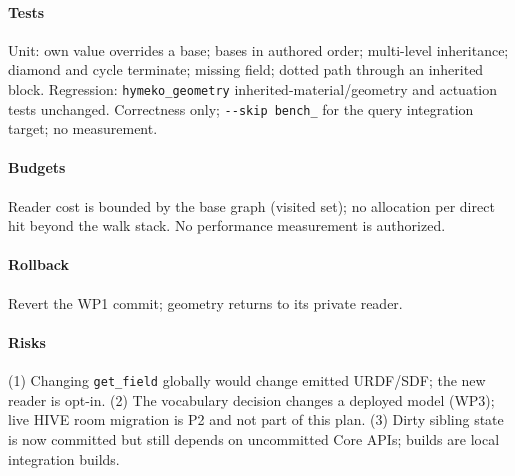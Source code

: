 \documentclass[11pt]{article}
\begin{document}
\paragraph{Tests} Unit: own value overrides a base; bases in authored order; multi-level
inheritance; diamond and cycle terminate; missing field; dotted path through an inherited block.
Regression: \texttt{hymeko\_geometry} inherited-material/geometry and actuation tests unchanged.
Correctness only; \texttt{-{}-skip bench\_} for the query integration target; no measurement.

\paragraph{Budgets} Reader cost is bounded by the base graph (visited set); no allocation per
direct hit beyond the walk stack. No performance measurement is authorized.

\paragraph{Rollback} Revert the WP1 commit; geometry returns to its private reader.

\paragraph{Risks} (1) Changing \texttt{get\_field} globally would change emitted URDF/SDF; the new
reader is opt-in. (2) The vocabulary decision changes a deployed model (WP3); live HIVE room
migration is P2 and not part of this plan. (3) Dirty sibling state is now committed but still
depends on uncommitted Core APIs; builds are local integration builds.
\end{document}
